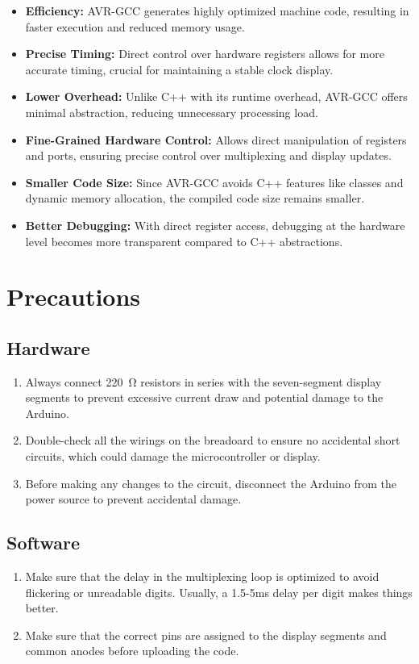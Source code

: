 \documentclass[a4paper,12pt]{article}
\theoremstyle{remark}
\begin{document}
\begin{itemize}
    \item \textbf{Efficiency:} AVR-GCC generates highly optimized machine code, resulting in faster execution and reduced memory usage.
    \item \textbf{Precise Timing:} Direct control over hardware registers allows for more accurate timing, crucial for maintaining a stable clock display.
    \item \textbf{Lower Overhead:} Unlike C++ with its runtime overhead, AVR-GCC offers minimal abstraction, reducing unnecessary processing load.
    \item \textbf{Fine-Grained Hardware Control:} Allows direct manipulation of registers and ports, ensuring precise control over multiplexing and display updates.
    \item \textbf{Smaller Code Size:} Since AVR-GCC avoids C++ features like classes and dynamic memory allocation, the compiled code size remains smaller.
    \item \textbf{Better Debugging:} With direct register access, debugging at the hardware level becomes more transparent compared to C++ abstractions.
\end{itemize}



\section{Precautions}
\subsection{Hardware}
\begin{enumerate}
    \item  Always connect \SI{220}{\ohm} resistors in series with the seven-segment display segments to prevent excessive current draw and potential damage to the Arduino.
    \item  Double-check all the wirings on the breadoard to ensure no accidental short circuits, which could damage the microcontroller or display.
    \item  Before making any changes to the circuit, disconnect the Arduino from the power source to prevent accidental damage.
\end{enumerate}

\subsection{Software}
\begin{enumerate}
    \item  Make sure that the delay in the multiplexing loop is optimized to avoid flickering or unreadable digits. Usually, a 1.5-5ms delay per digit makes things better.
    \item Make sure that the correct pins are assigned to the display segments and common anodes before uploading the code.
\end{enumerate}
\end{document}
